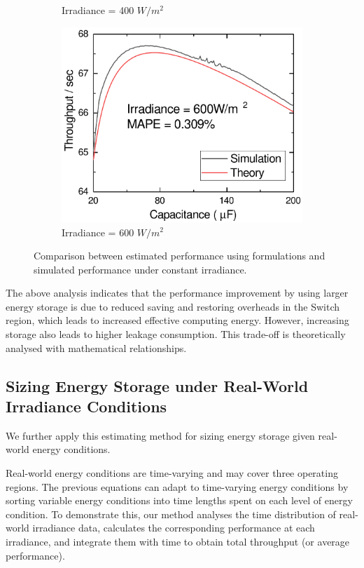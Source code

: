 \begin{figure}[H]
\begin{subfigure}{0.325\textwidth}
        \caption{Irradiance = 400 $W/m^2$}
    \end{subfigure}
    \begin{subfigure}{0.325\textwidth}
        \centering
        \includegraphics[width=\textwidth]{figure/work1/veriTheory600}
        \caption{Irradiance = 600 $W/m^2$}
    \end{subfigure}
       \caption{Comparison between estimated performance using formulations and simulated performance under constant irradiance.}
       \label{Figure:veriTheory}
\end{figure}

The above analysis indicates that the performance improvement by using larger energy storage is due to reduced saving and restoring overheads in the Switch region, which leads to increased effective computing energy. However, increasing storage also leads to higher leakage consumption. This trade-off is theoretically analysed with mathematical relationships. 

\subsection{Sizing Energy Storage under Real-World Irradiance Conditions} \label{Section:4.3}

We further apply this estimating method for sizing energy storage given real-world energy conditions. 

Real-world energy conditions are time-varying and may cover three operating regions. The previous equations can adapt to time-varying energy conditions by sorting variable energy conditions into time lengths spent on each level of energy condition. To demonstrate this, our method analyses the time distribution of real-world irradiance data, calculates the corresponding performance at each irradiance, and integrate them with time to obtain total throughput (or average performance).

